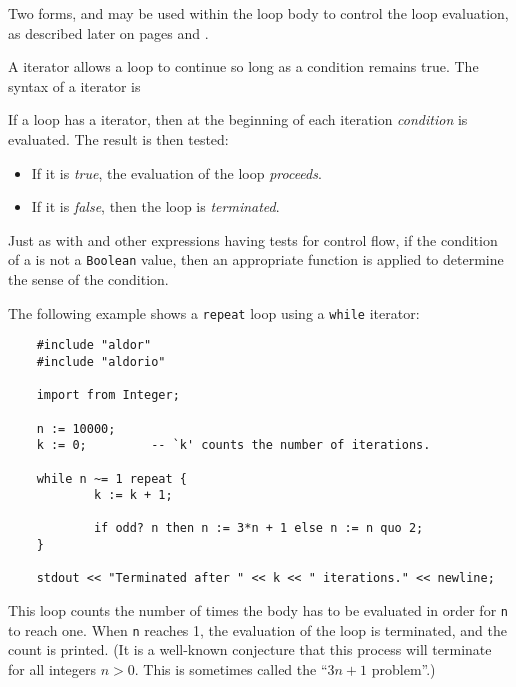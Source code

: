 Two forms,  and  may be used within the
loop body to control the loop evaluation, as described later
on pages \pageref{asugLangBreak} and \pageref{asugLangIterate}.


A  iterator allows a loop to continue so long as a condition
remains true.  The syntax of a  iterator is


If a loop has a  iterator, then at the beginning of each
iteration {\em condition} is evaluated.
The result is then tested:
\begin{itemize}
\item If it is {\em true}, the evaluation of the loop {\em proceeds}.
\item If it is {\em false}, then the loop is {\em terminated}.
\end{itemize}

Just as with  and other expressions having tests for control
flow, if the condition of a  is not a \verb"Boolean"
value, then an appropriate  function is applied to
determine the sense of the condition.

The following example shows a {\tt repeat} loop using a {\tt while} iterator:

\label{asugLangWhileExample}

\begin{small}
\begin{verbatim}
    #include "aldor"
    #include "aldorio"

    import from Integer;

    n := 10000;
    k := 0;         -- `k' counts the number of iterations.

    while n ~= 1 repeat {
            k := k + 1;

            if odd? n then n := 3*n + 1 else n := n quo 2;
    }

    stdout << "Terminated after " << k << " iterations." << newline;
\end{verbatim}
\end{small}

This loop counts the number of times the body has to be evaluated in
order for \verb"n" to reach one.  When \verb"n" reaches 1, the
evaluation of the loop is terminated, and the count is printed.
(It is a well-known conjecture that this process will terminate for all
integers $n > 0$.  This is sometimes called the ``$3 n + 1$
problem''.)

